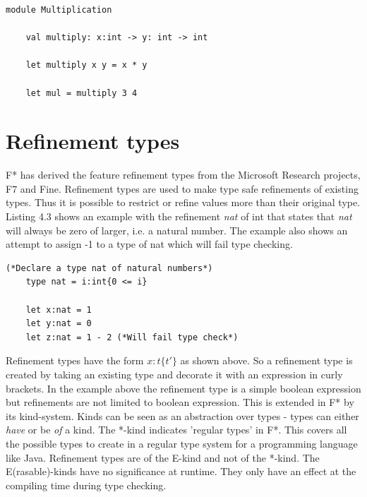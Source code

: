 \documentclass[twosided]{report}
\begin{document}
\begin{lstlisting}[style=fstar, caption={Multiplication example in F*}]
	module Multiplication

	val multiply: x:int -> y: int -> int
	
	let multiply x y = x * y
	
	let mul = multiply 3 4
\end{lstlisting}

\section{Refinement types}
F* has derived the feature refinement types from the Microsoft Research projects, F7 and Fine. Refinement types are used to make type safe refinements of existing types. Thus it is possible to restrict or refine values more than their original type. Listing 4.3 shows an example with the refinement \emph{nat} of int that states that \emph{nat} will always be zero of larger, i.e. a natural number. The example also shows an attempt to assign -1 to a type of nat which will fail type checking.
\begin{lstlisting}[style=fstar, caption={Simple refinement types in F*}]
	(*Declare a type nat of natural numbers*)	
	type nat = i:int{0 <= i}
	
	let x:nat = 1
	let y:nat = 0
	let z:nat = 1 - 2 (*Will fail type check*)
\end{lstlisting}

Refinement types have the form $x:t\{t'\}$ as shown above. So a refinement type is created by taking an existing type and decorate it with an expression in curly brackets. In the example above the refinement type is a simple boolean expression but refinements are not limited to boolean expression. This is extended in F* by its kind-system. Kinds can be seen as an abstraction over types - types can either \emph{have} or be \emph{of} a kind. The *-kind indicates 'regular types' in F*. This covers all the possible types to create in a regular type system for a programming language like Java. Refinement types are of the E-kind and not of the *-kind. The E(rasable)-kinds have no significance at runtime. They only have an effect at the compiling time during type checking.
\end{document}
